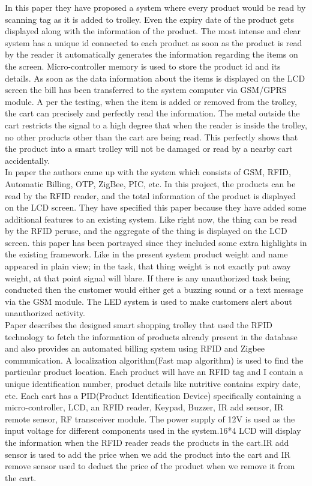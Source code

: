 \documentclass[conference]{IEEEtran}
\begin{document}
In this paper\cite{b12} they have proposed a system where every product would be read by scanning tag as it is added to trolley. Even the expiry date of the product gets displayed along with the information of the product. The most intense and clear system has a unique id connected to each product as soon as the product is read by the reader it automatically generates the information regarding the items on the screen. Micro-controller memory is used to store the product id and its details. As soon as the data information about the items is displayed on the LCD screen the bill has been transferred to the system computer via GSM/GPRS module.  A per the testing, when the item is added or removed from the trolley, the cart can precisely and perfectly read the information. The metal outside the cart restricts the signal to a high degree that when the reader is inside the trolley, no other products other than the cart are being read. This perfectly shows that the product into a smart trolley will not be damaged or read by a nearby cart accidentally.\\

In paper\cite{b13} the authors came up with the system which consists of GSM, RFID, Automatic Billing, OTP, ZigBee, PIC, etc. In this project, the products can be read by the RFID reader, and the total information of the product is displayed on the LCD screen. They have specified this paper because they have added some additional features to an existing system. Like right now, the thing can be read by the RFID peruse, and the aggregate of the thing is displayed on the LCD screen. this paper has been portrayed since they included some extra highlights in the existing framework.
Like in the present system product weight and name appeared in plain view; in the task, that thing weight is not exactly put away weight, at that point signal will blare. If there is any unauthorized task being conducted then the customer would either get a buzzing sound or a text message via the GSM module. The LED system is used to make customers alert about unauthorized activity.\\

Paper\cite{b14} describes the designed smart shopping trolley that used the RFID technology to fetch the information of products already present in the database and also provides an automated billing system using RFID and Zigbee communication. A localization algorithm(Fast map algorithm) is used to find the particular product location. Each product will have an RFID tag and I contain a unique identification number, product details like nutritive contains expiry date, etc. Each cart has a PID(Product Identification Device) specifically containing a micro-controller, LCD, an RFID reader, Keypad, Buzzer, IR add sensor, IR remote sensor, RF transceiver module. The power supply of 12V is used as the input voltage for different components used in the system.16*4 LCD will display the information when the RFID reader reads the products in the cart.IR add sensor is used to add the price when we add the product into the cart and IR remove sensor used to deduct the price of the product when we remove it from the cart.\\
\end{document}
